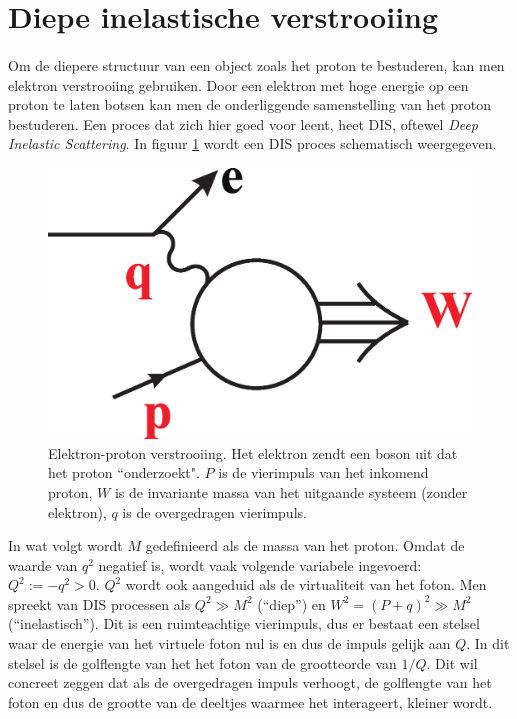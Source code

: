 \documentclass[a4paper,11pt]{article}
\numberwithin{equation}{section} %
\begin{document}
\thispagestyle{empty}
\newpage

\tableofcontents
\thispagestyle{empty}
\newpage

\section{Diepe inelastische verstrooiing}
      \paragraph{}
Om de diepere structuur van een object zoals het proton te bestuderen, kan men elektron verstrooiing gebruiken.
Door een elektron met hoge energie op een proton te laten botsen kan men de onderliggende samenstelling van het proton bestuderen.
Een proces dat zich hier goed voor leent, heet DIS, oftewel \textit{Deep Inelastic Scattering}. In figuur \ref{fig:DIS} wordt een DIS proces schematisch weergegeven.
\begin{figure} [H]
  \begin{center}
    \includegraphics[width=.33\textwidth]{Afbeeldingen/DIS.eps}
    \caption{Elektron-proton verstrooiing.
Het elektron zendt een boson uit dat het proton “onderzoekt".
$P$ is de vierimpuls van het inkomend proton, $W$ is de invariante massa van het uitgaande systeem (zonder elektron), $q$ is de overgedragen vierimpuls. \cite{Martin}}
   \label{fig:DIS}
  \end{center}
\end{figure}
 In wat volgt wordt $M$ gedefinieerd als de massa van het proton.
Omdat de waarde van $q^2$ negatief is, wordt vaak volgende variabele ingevoerd: $Q^2 :=-q^2 > 0$.
$Q^2$ wordt ook aangeduid als de virtualiteit van het foton.
Men spreekt van DIS processen als $Q^2 \gg M^2$ (“diep”) en $W^2 = (P+q)^2 \gg M^2$ (“inelastisch”).
  Dit is een ruimteachtige vierimpuls, dus er bestaat een stelsel waar de energie van het virtuele foton nul is en dus de impuls gelijk aan $Q$. In dit stelsel is de golflengte van het het foton van de grootteorde van $1/Q$.
Dit wil concreet zeggen dat als de overgedragen impuls verhoogt, de golflengte van het foton en dus de grootte van de deeltjes waarmee het interageert, kleiner wordt.
\end{document}
